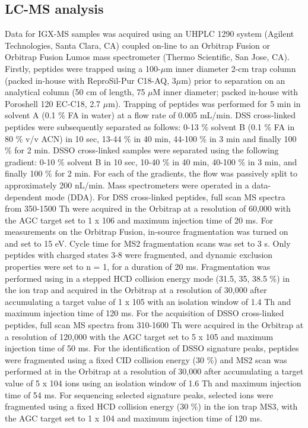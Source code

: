 \subsection*{LC-MS analysis}
Data for IGX-MS samples was acquired using an UHPLC 1290 system (Agilent Technologies, Santa Clara, CA) coupled on-line to an Orbitrap Fusion or Orbitrap Fusion Lumos mass spectrometer (Thermo Scientific, San Jose, CA). Firstly, peptides were trapped using a 100-$\mu$m inner diameter 2-cm trap column (packed in-house with ReproSil-Pur C18-AQ, 3$\mu$m) prior to separation on an analytical column (50 cm of length, 75 $\mu$M inner diameter; packed in-house with Poroshell 120 EC-C18, 2.7 $\mu$m). Trapping of peptides was performed for 5 min in solvent A (0.1 \% FA in water) at a flow rate of 0.005 mL/min. DSS cross-linked peptides were subsequently separated as follows: 0-13 \% solvent B (0.1 \% FA in 80 \% v/v ACN) in 10 sec, 13-44 \% in 40 min, 44-100 \% in 3 min and finally 100 \% for 2 min. DSSO cross-linked samples were separated using the following gradient: 0-10 \% solvent B in 10 sec, 10-40 \% in 40 min, 40-100 \% in 3 min, and finally 100 \% for 2 min. For each of the gradients, the flow was passively split to approximately 200 nL/min. Mass spectrometers were operated in a data-dependent mode (DDA). For DSS cross-linked peptides, full scan MS spectra from 350-1500 Th were acquired in the Orbitrap at a resolution of 60,000 with the AGC target set to 1 x 106 and maximum injection time of 20 ms. For measurements on the Orbitrap Fusion, in-source fragmentation was turned on and set to 15 eV. Cycle time for MS2 fragmentation scans was set to 3 s. Only peptides with charged states 3-8 were fragmented, and dynamic exclusion properties were set to n = 1, for a duration of 20 ms. Fragmentation was performed using in a stepped HCD collision energy mode (31.5, 35, 38.5 \%) in the ion trap and acquired in the Orbitrap at a resolution of 30,000 after accumulating a target value of 1 x 105 with an isolation window of 1.4 Th and maximum injection time of 120 ms. For the acquisition of DSSO cross-linked peptides, full scan MS spectra from 310-1600 Th were acquired in the Orbitrap at a resolution of 120,000 with the AGC target set to 5 x 105 and maximum injection time of 50 ms. For the identification of DSSO signature peaks, peptides were fragmented using a fixed CID collision energy (30 \%) and MS2 scan was performed at in the Orbitrap at a resolution of 30,000 after accumulating a target value of 5 x 104 ions using an isolation window of 1.6 Th and maximum injection time of 54 ms. For sequencing selected signature peaks, selected ions were fragmented using a fixed HCD collision energy (30 \%) in the ion trap MS3, with the AGC target set to 1 x 104 and maximum injection time of 120 ms.

